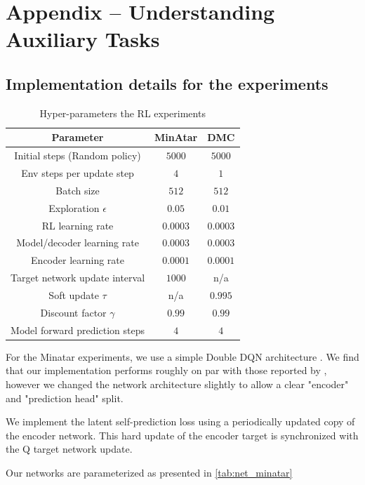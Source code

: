 \chapter{Appendix -- Understanding Auxiliary Tasks}


\section{Implementation details for the experiments}
\label{app:understanding:empirical}

\begin{table}[t]
    \centering
    \begin{tabular}{c|c|c}
        Parameter & MinAtar & DMC \\\hline 
        Initial steps (Random policy) & $5000$ & $5000$  \\
        Env steps per update step & $4$ & $1$\\
        Batch size & $512$ & $512$\\
        Exploration $\epsilon$ & $0.05$ & $0.01$\\
        RL learning rate & $0.0003$ & $0.0003$\\
        Model/decoder learning rate & $0.0003$ & $0.0003$\\
        Encoder learning rate & $0.0001$ & $0.0001$\\
        Target network update interval & $1000$ & n/a\\
        Soft update $\tau$ & n/a & $0.995$ \\
        Discount factor $\gamma$ & $0.99$ & $0.99$\\
        Model forward prediction steps & $4$ & $4$\\
    \end{tabular}
    \caption{Hyper-parameters the RL experiments}
    \label{tab:hyper_minatar}
\end{table}

For the Minatar experiments, we use a simple Double DQN architecture \parencite{van2016deep}.
We find that our implementation performs roughly on par with those reported by \textcite{young19minatar}, however we changed the network architecture slightly to allow a clear "encoder" and "prediction head" split.

We implement the latent self-prediction loss using a periodically updated copy of the encoder network. This hard update of the encoder target is synchronized with the Q target network update.

Our networks are parameterized as presented in \autoref{tab:net_minatar}


